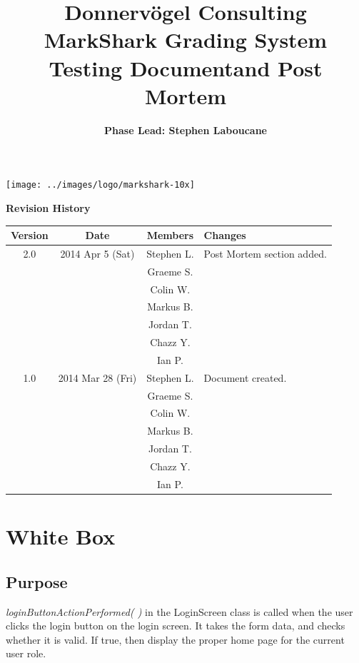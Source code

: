 \documentclass{article}
\begin{document}
\title{Donnervögel Consulting \\ MarkShark Grading System \\ Testing Documentand Post Mortem}
\author{\textbf{Phase Lead: Stephen Laboucane}}
\maketitle
\centerline{\texttt{[image: ../images/logo/markshark-10x]}}
\clearpage

\textbf{Revision History}
\begin{center}
  \begin{tabular}{| c | c | c | l |}
    \hline
    Version & Date & Members & Changes\\
    \hline
    2.0 & 2014 Apr 5 (Sat) & Stephen L. & Post Mortem section added.\\
    & & Graeme S. & \\
    & & Colin W. &\\
    & & Markus B.&\\
    & & Jordan T. &\\
	& & Chazz Y. &\\
    & & Ian P. &\\
    \hline
    1.0 & 2014 Mar 28 (Fri) & Stephen L. & Document created.\\
    & & Graeme S. & \\
    & & Colin W. &\\
    & & Markus B.&\\
    & & Jordan T. &\\
	& & Chazz Y. &\\
    & & Ian P. &\\
    \hline
  \end{tabular}
\end{center}
\clearpage

\tableofcontents
\clearpage

\section{White Box} 
\subsection{Purpose}
\textit{loginButtonActionPerformed( )} in the LoginScreen class is called when the user clicks the login button on the login screen.  It takes the form data, and checks whether it is valid.  If true, then display the proper home page for the current user role.
\end{document}
